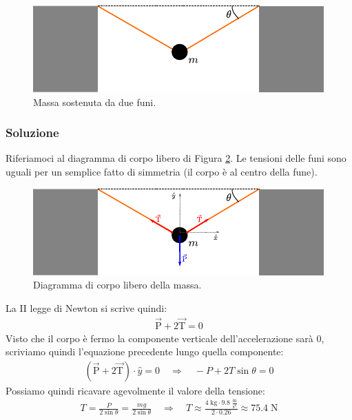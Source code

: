 \documentclass[12pt,a4paper]{book}
\begin{document}
\begin{figure}[!ht]
\centering
\includegraphics[scale=1.5]{e-10-1.pdf}
\caption{Massa sostenuta da due funi.} 
\label{fig:4-e-10-1} 
\end{figure}

\subsubsection*{Soluzione}
Riferiamoci al diagramma di corpo libero di Figura \ref{fig:4-e-10-2}. Le tensioni delle funi sono uguali per un semplice fatto di simmetria (il corpo è al centro della fune).

\begin{figure}[!ht]
\centering
\includegraphics[scale=1.5]{e-10-2.pdf}
\caption{Diagramma di corpo libero della massa.} 
\label{fig:4-e-10-2} 
\end{figure}

La II legge di Newton si scrive quindi:
%
\begin{gather*}
\vec{\text{P}}+2\vec{\text{T}}=0
\end{gather*}
%
Visto che il corpo è fermo la componente verticale dell'accelerazione sarà 0, scriviamo quindi l'equazione precedente lungo quella componente:
%
\begin{gather*}
(\vec{\text{P}}+2\vec{\text{T}})\cdot\hat{y}=0 \quad \Longrightarrow \quad -P +2T\sin\theta=0
\end{gather*}
%
Possiamo quindi ricavare agevolmente il valore della tensione:
%
\begin{gather*}
T=\frac{P}{2\sin\theta}=\frac{mg}{2\sin\theta} \quad \Longrightarrow \quad T \approx \frac{4\;\text{kg}\cdot 9.8 \;\frac{\text{m}}{\text{s}^2}}{2\cdot0.26}\approx 75.4 \;\text{N}
\end{gather*}
%
\end{document}

